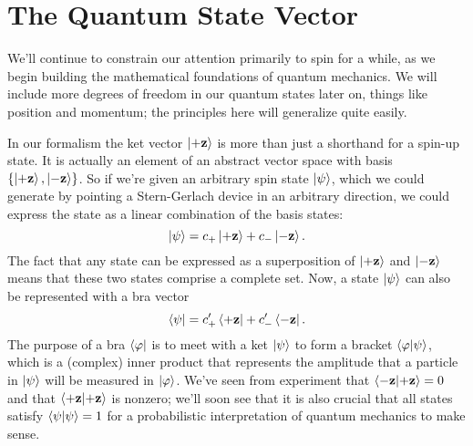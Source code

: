 \documentclass[../p116main.tex]{subfiles}
\begin{document}
\section{The Quantum State Vector}
We'll continue to constrain our attention primarily to spin for a while, as we begin building the mathematical foundations of quantum mechanics.
We will include more degrees of freedom in our quantum states later on, things like position and momentum; the principles here will generalize quite easily.

In our formalism the ket vector $\left| +\mathbf{z} \right>$ is more than just a shorthand for a spin-up state.
It is actually an element of an abstract vector space with basis $\left\{ \left| +\mathbf{z} \right>, \left| -\mathbf{z} \right> \right\}$.
So if we're given an arbitrary spin state $\left| \psi \right>$, which we could generate by pointing a Stern-Gerlach device in an arbitrary direction, we could express the state as a linear combination of the basis states:
\[ \left| \psi \right> = c_+ \left| +\mathbf{z} \right> + c_- \left| -\mathbf{z} \right>. \]
The fact that any state can be expressed as a superposition of $\left| +\mathbf{z} \right>$ and $\left| -\mathbf{z} \right>$ means that these two states comprise a complete set.
Now, a state $\left| \psi \right>$ can also be represented with a bra vector
\[ \left< \psi \right| = c_+' \left< +\mathbf{z} \right| + c_-' \left< -\mathbf{z} \right|. \]
The purpose of a bra $\left< \varphi \right|$ is to meet with a ket $\left| \psi \right>$ to form a bracket $\left< \varphi \middle| \psi \right>$, which is a (complex) inner product that represents the amplitude that a particle in $\left| \psi \right>$ will be measured in $\left| \varphi \right>$.
We've seen from experiment that $\left< -\mathbf{z} \middle| +\mathbf{z} \right> = 0$ and that $\left< +\mathbf{z} \middle| +\mathbf{z} \right>$ is nonzero; we'll soon see that it is also crucial that all states satisfy $\left< \psi \middle| \psi \right> = 1$ for a probabilistic interpretation of quantum mechanics to make sense.
\end{document}
